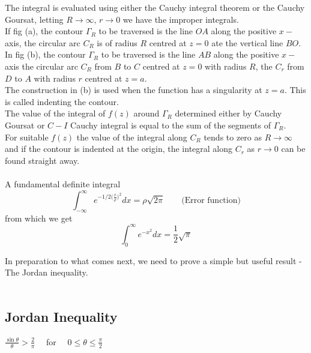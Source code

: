 \documentclass[11pt,a4paper]{article}
\theoremstyle{definition}
\begin{document}
The integral is evaluated using either the Cauchy integral theorem or the Cauchy Goursat, letting $R\longrightarrow \infty,\, r\longrightarrow  0$ we have the improper integrals.\\


If fig (a), the contour $\Gamma_R$ to be traversed is the line $OA$ along the positive $x-$axis, the circular arc $C_R$ is of radius $R$ centred at $z = 0$ ate the vertical line $BO$.\\


In fig (b), the contour $\Gamma_R$ to be traversed is the line $AB$ along the positive $x-$axis the circular arc $C_R$ from $B$ to $C$ centred at $z = 0$ with radius $R$, the  $C_r$ from $D$ to $A$ with radius $r$ centred at $z = a$.\\

The construction in (b) is used when the function has a singularity at $z = a$. This is called indenting the contour.\\

The value of the integral of $f(z)$ around $\Gamma_R$ determined either by Cauchy Goursat or $C-I$ Cauchy integral is equal to the sum of the segments of $\Gamma_R$.\\

For suitable $f(z)$ the value of the integral along $C_R$ tends to zero as $R\longrightarrow \infty$ and if the contour is indented at the origin, the integral along $C_r$ as $r\longrightarrow 0$ can be found straight away.\\\\


A fundamental definite integral $$\int^{\infty}_{-\infty} e^{-1/2\Big(\frac{x}{\rho}\Big)^2} dx = \rho \sqrt{2\pi}\qquad  \Big(\text{Error function}\Big)$$
from which we get 
$$\int^{\infty}_0e^{-x^2}dx = \frac{1}{2}\sqrt{\pi}$$

In preparation to what comes next, we need to prove a simple but useful result - The Jordan inequality.\\\\





{\color[wave]{485}\subsection{Jordan Inequality}}
$\frac{\sin \theta}{\theta} > \frac{2}{\pi}\quad $ for $\quad  0\leq \theta \leq \frac{\pi}{2}$\\\\
\end{document}
